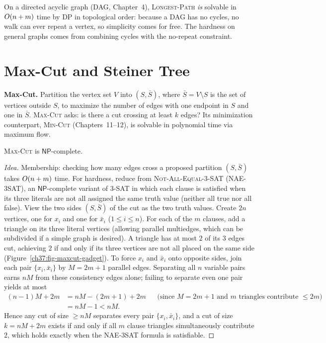 \begin{intuitionbox}
On a directed acyclic graph (DAG, Chapter~4), \textsc{Longest-Path} \emph{is} solvable in $O(n+m)$ time
by DP in topological order: because a DAG has no cycles, no walk can ever repeat a vertex, so simplicity comes for free.
The hardness on general graphs comes from combining cycles with the no-repeat constraint.
\end{intuitionbox}

\section{Max-Cut and Steiner Tree}
\label{ch37:maxcut-steiner}

\textbf{Max-Cut.} Partition the vertex set $V$ into $(S,\bar{S})$, where $\bar{S}=V\setminus S$ is the set of vertices outside $S$, to maximize the number of edges
with one endpoint in $S$ and one in $\bar{S}$. \textsc{Max-Cut} asks: is there a cut crossing at least $k$ edges? Its minimization counterpart,
\textsc{Min-Cut} (Chapters~11--12), is solvable in polynomial time via maximum flow.

\begin{theorem}
\label{ch37:thm-maxcut}
\textsc{Max-Cut} is $\mathsf{NP}$-complete.
\end{theorem}

\begin{proof}[Idea]
Membership: checking how many edges cross a proposed partition $(S,\bar{S})$ takes $O(n+m)$ time. For hardness, reduce from \textsc{Not-All-Equal-3-SAT} (\textsc{NAE-3SAT}), an $\mathsf{NP}$-complete variant of \textsc{3-SAT} in which each clause is satisfied when its three literals are not all assigned the same truth value (neither all true nor all false).
View the two sides $(S,\bar{S})$ of the cut as the two truth values.
Create $2n$ vertices, one for $x_i$ and one for $\bar{x}_i$ ($1\le i\le n$).
For each of the $m$ clauses, add a triangle on its three literal vertices (allowing parallel multiedges, which can be subdivided if a simple graph is desired). A triangle has at most $2$ of its $3$ edges cut, achieving $2$ if and only if its three vertices are not all placed on the same side (Figure~\ref{ch37:fig-maxcut-gadget}). To force $x_i$ and $\bar{x}_i$ onto opposite sides, join each pair $\{x_i,\bar{x}_i\}$ by $M=2m+1$ parallel edges. Separating all $n$ variable pairs earns $nM$ from these consistency edges alone; failing to separate even one pair yields at most
\begin{align*}
  (n-1)M + 2m
  &= nM - (2m+1) + 2m && \text{(since $M = 2m+1$ and $m$ triangles contribute $\le 2m$)} \\
  &= nM - 1 < nM.
\end{align*}
Hence any cut of size $\ge nM$ separates every pair $\{x_i,\bar{x}_i\}$, and a cut of size $k = nM + 2m$ exists if and only if all $m$ clause triangles simultaneously contribute $2$, which holds exactly when the \textsc{NAE-3SAT} formula is satisfiable.
\end{proof}

